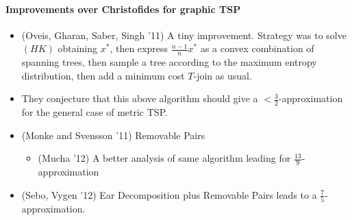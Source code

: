 \documentclass[letterpaper,12pt,oneside,onecolumn]{article}
\begin{document}
\paragraph{Improvements over Christofides for graphic TSP}
\begin{itemize}
\item(Oveis, Gharan,  Saber, Singh '11) A tiny improvement. Strategy was to solve $(HK)$ obtaining $x^*$, then express $\frac{n-1}{n}x^*$ as a convex combination of spanning trees, then sample a tree according to the maximum entropy distribution, then add a minimum cost $T$-join as usual.
\item They conjecture that this above algorithm should give a $<\frac{3}{2}$-approximation for the general case of metric TSP.
\item (Monke and Svensson '11) Removable Pairs
\begin{itemize}
\item (Mucha '12) A better analysis of same algorithm leading for $\frac{13}{9}$-approximation 
\end{itemize}
\item (Sebo, Vygen '12) Ear Decomposition plus Removable Pairs leads to a $\frac{7}{5}$-approximation.
\end{itemize}
\end{document}
